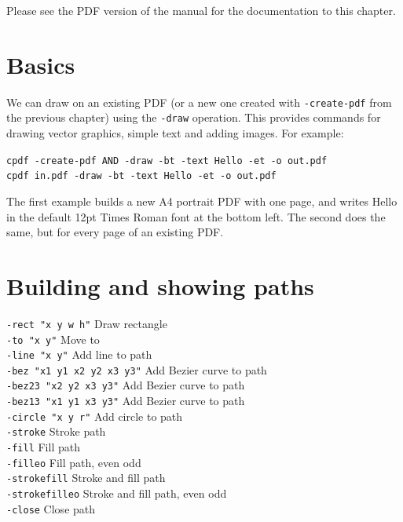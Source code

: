 \documentclass{book}
\begin{document}
\ifdefined\HCode
  Please see the PDF version of the manual for the documentation to this chapter.
\else


\section{Basics}

We can draw on an existing PDF (or a new one created with \texttt{-create-pdf} from the previous chapter) using the \texttt{-draw} operation. This provides commands for drawing vector graphics, simple text and adding images. For example:

\begin{framed}
 \noindent\small\verb?cpdf -create-pdf AND -draw -bt -text Hello -et -o out.pdf?\\
 \noindent\small\verb?cpdf in.pdf -draw -bt -text Hello -et -o out.pdf?
\end{framed}

\noindent The first example builds a new A4 portrait PDF with one page, and writes Hello in the default 12pt Times Roman font at the bottom left. The second does the same, but for every page of an existing PDF.

\section{Building and showing paths}

  {\small\begin{framed}
   \noindent\verb!-rect "x y w h"! Draw rectangle\\
   \noindent\verb!-to "x y"! Move to\\
   \noindent\verb!-line "x y"! Add line to path\\
   \noindent\verb!-bez "x1 y1 x2 y2 x3 y3"! Add Bezier curve to path\\
   \noindent\verb!-bez23 "x2 y2 x3 y3"! Add Bezier curve to path\\
   \noindent\verb!-bez13 "x1 y1 x3 y3"! Add Bezier curve to path\\
   \noindent\verb!-circle "x y r"! Add circle to path\\
   \noindent\verb!-stroke! Stroke path\\
   \noindent\verb!-fill! Fill path\\
   \noindent\verb!-filleo! Fill path, even odd\\
   \noindent\verb!-strokefill! Stroke and fill path\\
   \noindent\verb!-strokefilleo! Stroke and fill path, even odd\\
   \noindent\verb!-close! Close path
  \end{framed}}
\end{document}
